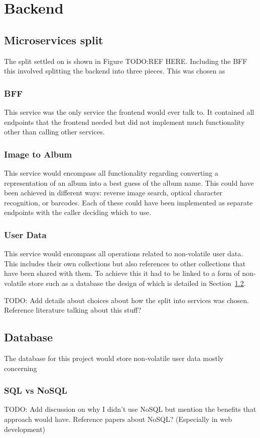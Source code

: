 \section{Backend} \label{sec:backend-design}
\subsection{Microservices split} %
The split settled on is shown in Figure TODO:REF HERE. Including the BFF this involved splitting the backend into three pieces. This was chosen as

\subsubsection{BFF}
This service was the only service the frontend would ever talk to. It contained all endpoints that the frontend needed but did not implement much functionality other than calling other services.
\subsubsection{Image to Album}
This service would encompass all functionality regarding converting a representation of an album into a best guess of the album name. This could have been achieved in different ways: reverse image search, optical character recognition, or barcodes. Each of these could have been implemented as separate endpoints with the caller deciding which to use.
\subsubsection{User Data}
This service would encompass all operations related to non-volatile user data. This includes their own collections but also references to other collections that have been shared with them. To achieve this it had to be linked to a form of non-volatile store such as a database the design of which is detailed in Section~\ref{sec:database}.

TODO: Add details about choices about how the split into services was chosen. Reference literature talking about this stuff?

\subsection{Database} \label{sec:database}
The database for this project would store non-volatile user data mostly concerning

\subsubsection{SQL vs NoSQL}
TODO: Add discussion on why I didn't use NoSQL but mention the benefits that approach would have. Reference papers about NoSQL? (Especially in web development)
